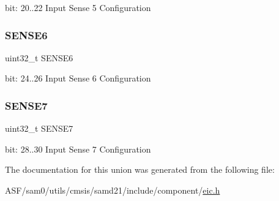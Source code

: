 bit\+: 20..22 Input Sense 5 Configuration \mbox{\label{union_e_i_c___c_o_n_f_i_g___type_ab761029d8def8e5425d57854dcdeb371}} 
\subsubsection{\texorpdfstring{SENSE6}{SENSE6}}
{\footnotesize\ttfamily uint32\+\_\+t S\+E\+N\+S\+E6}

bit\+: 24..26 Input Sense 6 Configuration \mbox{\label{union_e_i_c___c_o_n_f_i_g___type_a7972a41517fe4d04628710ff3bd762d9}} 
\subsubsection{\texorpdfstring{SENSE7}{SENSE7}}
{\footnotesize\ttfamily uint32\+\_\+t S\+E\+N\+S\+E7}

bit\+: 28..30 Input Sense 7 Configuration 

The documentation for this union was generated from the following file\+:\begin{DoxyCompactItemize}
\item 
A\+S\+F/sam0/utils/cmsis/samd21/include/component/\mbox{\hyperlink{component_2eic_8h}{eic.\+h}}\end{DoxyCompactItemize}
